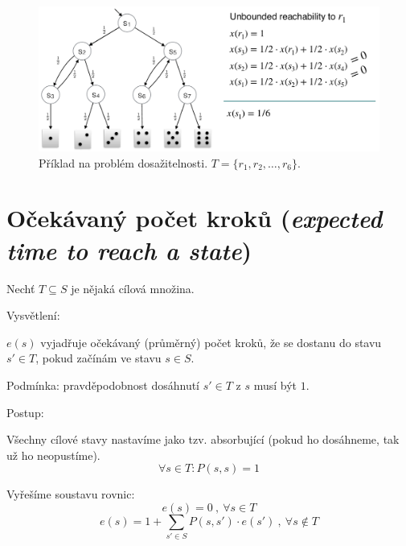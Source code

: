 \begin{figure}[H]
    \centering
    \includegraphics[width=1\linewidth]{priklad_4.pdf}
    \caption{Příklad na problém dosažitelnosti. $T = \{ r_1, r_2, \ldots, r_6 \}$.}
\end{figure}


\section{Očekávaný počet kroků (\textit{expected time to reach a state})}

\begin{compactitem}
    \item Nechť $T \subseteq S$ je nějaká cílová množina.

    \item Vysvětlení: \begin{compactitem}
        \item $e(s)$ vyjadřuje očekávaný (průměrný) počet kroků, že se dostanu do stavu $s' \in T$, pokud začínám ve stavu $s \in S$.
        \item Podmínka: pravděpodobnost dosáhnutí $s' \in T$ z $s$ musí být $1$.
    \end{compactitem}

    \item Postup: \begin{compactitem}
        \item Všechny cílové stavy nastavíme jako tzv. absorbující (pokud ho dosáhneme, tak už ho neopustíme).
        $$ \forall s \in T : P(s, s) = 1 $$

        \item Vyřešíme soustavu rovnic:
        $$ e(s) = 0 ~,~ \forall s \in T $$
        $$ e(s) = 1 + \sum_{s' \in S} P(s, s') \cdot e(s') ~,~ \forall s \not\in T $$
    \end{compactitem}

\end{compactitem}


